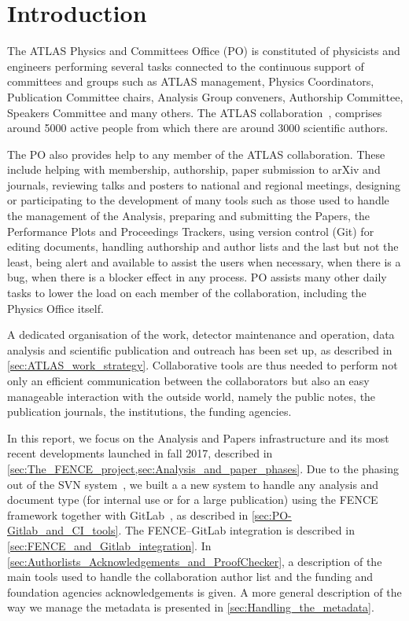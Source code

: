 
\section{Introduction}%
\label{sec:Introduction}

The ATLAS Physics and Committees Office (PO) is constituted of physicists and engineers performing several tasks connected to the continuous support of committees and groups such as ATLAS management, Physics Coordinators, Publication Committee chairs, Analysis Group conveners, Authorship Committee, Speakers
Committee and many others. The ATLAS collaboration~\cite{PERF-2007-01}, comprises around 5000 active people from which there are around 3000 scientific authors.

The PO also provides help to any member of the ATLAS collaboration. These include helping with membership, authorship, paper submission to arXiv and journals, reviewing talks and posters to national and regional meetings, designing or participating to the development of many tools such as those used to handle the management of the Analysis, preparing and submitting the Papers, the Performance Plots and Proceedings Trackers, using version control (Git) for editing documents, handling authorship and  author lists and the last but not the least, being alert  and available to assist the users when necessary, when there is a bug, when there is a blocker effect in any process.
PO assists many other daily tasks to lower the load on each member of the collaboration, including the Physics Office itself.

A dedicated organisation of the work, detector maintenance and operation, data analysis and scientific publication and outreach has been set up, as described in \cref{sec:ATLAS_work_strategy}.
Collaborative tools are thus needed to perform not only an efficient communication between the collaborators but also an easy manageable interaction with the outside world, namely the public notes, the publication journals, the institutions, the funding agencies.

In this report, we focus on the Analysis and Papers infrastructure and its most recent developments launched in fall 2017, described in \cref{sec:The_FENCE_project,sec:Analysis_and_paper_phases}.
Due to the phasing out of the SVN system~\cite{svn}, we built a a new system to handle any analysis and document type (for internal use or for a large publication) using the FENCE framework  together with GitLab~\cite{gitlab}, as described in \cref{sec:PO-Gitlab_and_CI_tools}.
The FENCE--GitLab integration is described in \cref{sec:FENCE_and_Gitlab_integration}. In \cref{sec:Authorlists_Acknowledgements_and_ProofChecker}, a description of the main tools used to handle the collaboration author list and the funding and foundation agencies acknowledgements is given.
A more general description of the way we manage the metadata is presented in \cref{sec:Handling_the_metadata}.
